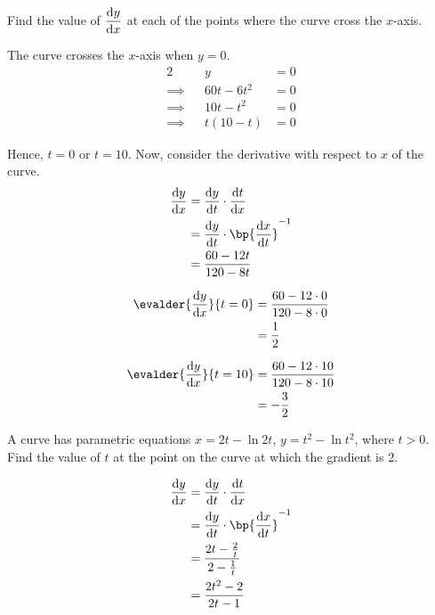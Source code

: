 \documentclass{echw}
\begin{document}
        Find the value of $\dfrac{\mathrm{d} y}{\mathrm{d} x}$ at each of the points where the curve cross the $x$-axis.

    \solution
        The curve crosses the $x$-axis when $y=0$.
        \begin{alignat*}{2}
            &&y &= 0\\
            \implies&&60t-6t^2 &= 0\\
            \implies&&10t-t^2 &= 0\\
            \implies&&t(10 - t) &= 0
        \end{alignat*}

        Hence, $t = 0$ or $t = 10$. Now, consider the derivative with respect to $x$ of the curve.
        \begin{align*}
            \der{y}{x} &= \der{y}{t} \cdot \der{t}{x}\\
            &= \der{y}{t} \cdot \bp{\der{x}{t}}^{-1}\\
            &= \dfrac{60 - 12t}{120 - 8t}
        \end{align*}

        \begin{align*}
            \evalder{\der{y}{x}}{t = 0} &= \dfrac{60 - 12\cdot 0}{120 - 8\cdot0}\\
            &= \dfrac12
        \end{align*}

        \begin{align*}
            \evalder{\der{y}{x}}{t = 10} &= \dfrac{60 - 12\cdot 10}{120 - 8\cdot10}\\
            &= -\dfrac32
        \end{align*}


    \problem{}
        A curve has parametric equations $x = 2t-\ln{2t}, \, y = t^2 - \ln t^2$, where $t > 0$. Find the value of $t$ at the point on the curve at which the gradient is 2.

    \solution
        \begin{align*}
            \der{y}{x} &= \der{y}{t} \cdot \der{t}{x}\\
            &= \der{y}{t} \cdot \bp{\der{x}{t}}^{-1}\\
            &= \dfrac{2t - \tfrac2t}{2 - \tfrac1t}\\
            &= \dfrac{2t^2 - 2}{2t - 1}
        \end{align*}
\end{document}

